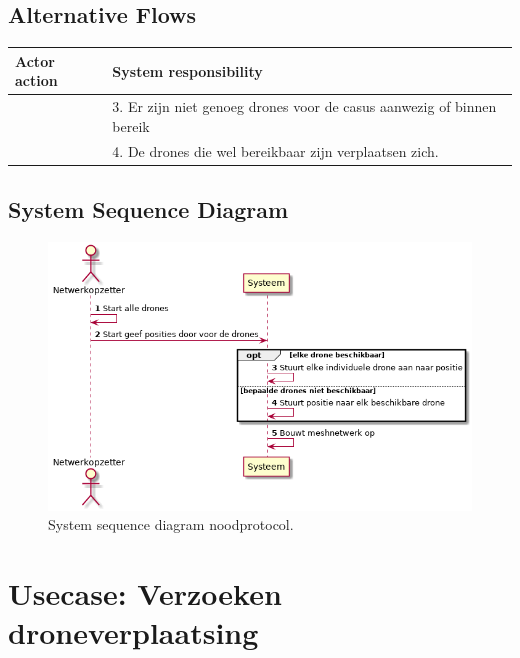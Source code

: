\documentclass[a4paper, 11pt, oneside]{report}
\begin{document}
\subsection{Alternative Flows}


\begin{table}[H]
	\centering
	\begin{tabular}{|l|l|}
		\hline
		\rowcolor[HTML]{C0C0C0} 
		Actor action  & System responsibility   \\ \hline
		& 3. Er zijn niet genoeg drones voor de casus aanwezig of binnen bereik    \\ \hline
		& 4. De drones die wel bereikbaar zijn verplaatsen zich.      	    \\ \hline
	\end{tabular}
\end{table}

\subsection{System Sequence Diagram }
\label{Usecase:ontplooien:systemsequence}


\begin{figure}[H]
	\begin{center}\includegraphics[height=.4\textheight]{UML/out/usecase/sequence/ontplooien/ontplooien.png}\end{center}
	\caption{System sequence diagram noodprotocol.}
	\label{fig:ontplooien:systemsequence}
\end{figure}


\section[Verzoeken droneverplaatsing]{Usecase: Verzoeken droneverplaatsing}
\label{Usecase:verzoekverplaatsing}
\end{document}
